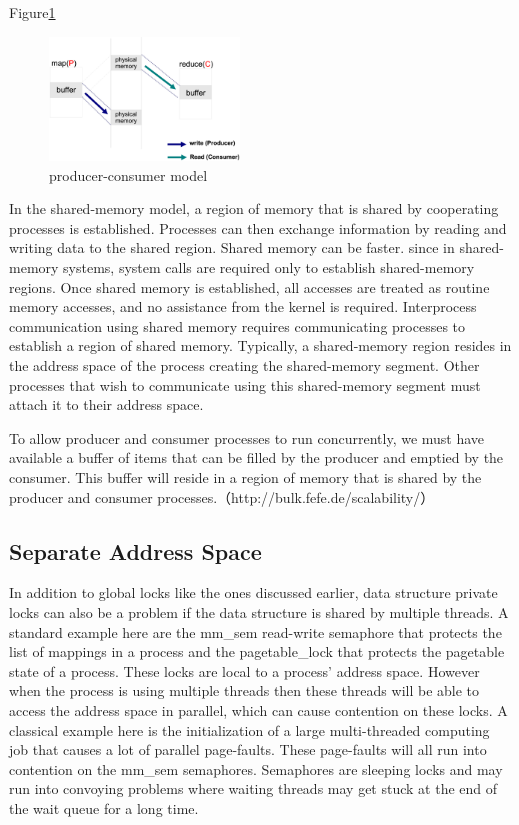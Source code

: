 Figure\ref{fig:dmr:spmc}
\begin{figure}[!h!t]
    \centering
    \includegraphics[width=0.45\textwidth]{eps/dmr_pc_model.eps}
    \caption{producer-consumer model}
    \label{fig:dmr:spmc}
\end{figure}
{\color{gray}
In the shared-memory model, a region of memory that is shared
by cooperating processes is established. 
Processes can then exchange information 
by reading and writing data to the shared region.
Shared memory can be faster.
since in shared-memory systems, system calls are required only to establish shared-memory regions. 
Once shared memory is established, all accesses are treated
as routine memory accesses, and no assistance from the kernel is required.
}
Interprocess communication using shared memory requires communicating
processes to establish a region of shared memory. Typically, a shared-memory
region resides in the address space of the process creating the shared-memory
segment. Other processes that wish to communicate using this shared-memory
segment must attach it to their address space. 

To allow producer and consumer processes to run concurrently, we must have
available a buffer of items that can be filled by the producer and emptied by
the consumer. This buffer will reside in a region of memory that is shared by
the producer and consumer processes.（http://bulk.fefe.de/scalability/）



\subsection{Separate Address Space}
In addition to global locks like the ones discussed earlier, 
data structure private locks can also be a problem 
if the data structure is shared by multiple threads. 
A standard example here are the mm\_sem read-write semaphore 
that protects the list of mappings in a process and 
the pagetable\_lock that protects the pagetable state of a process. 
These locks are local to a process’ address space. 
However when the process is using multiple threads 
then these threads will be able to access the address space in parallel,
which can cause contention on these locks. 
A classical example here is 
the initialization of a large multi-threaded computing job 
that causes a lot of parallel page-faults. 
These page-faults will all run into contention on the mm\_sem semaphores. Semaphores are sleeping locks 
and may run into convoying problems 
where waiting threads may 
get stuck at the end of the wait queue for a long time.\cite{Andi2009lmulticore}

